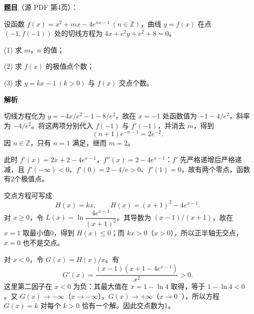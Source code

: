 \begin{answer}

\textbf{题目}（源 PDF 第4页）：

设函数 \(f(x)=x^2+mx-4e^{nx-1}\ (n\in\mathbb{Z})\)，曲线 \(y=f(x)\) 在点 \((-1,f(-1))\) 处的切线方程为 \(4x+e^2y+e^2+8=0\)。

(1) 求 \(m，n\) 的值；

(2) 求 \(f(x)\) 的极值点个数；

(3) 求 \(y=kx-1\ (k>0)\) 与 \(f(x)\) 交点个数。

\textbf{解析}


切线方程化为 \(y=-4x/e^2-1-8/e^2\)，故在 \(x=-1\) 处函数值为 \(-1-4/e^2\)，斜率为 \(-4/e^2\)。将这两项分别代入 \(f(-1)\) 与 \(f'(-1)\)，并消去 \(m\)，得到
\nopagebreak[4]
\[
(n+1)e^{-n-1}=2e^{-2}.
\]
因 \(n\in\mathbb Z\)，只有 \(n=1\) 满足，继而 \(m=2\)。


此时 \(f'(x)=2x+2-4e^{x-1}\)，\(f''(x)=2-4e^{x-1}\)：\(f'\) 先严格递增后严格递减，且 \(f'(-\infty)<0\)、\(f'(0)=2-4/e>0\)、\(f'(1)=0\)，故有两个零点，函数有2个极值点。


交点方程可写成
\nopagebreak[4]
\[
H(x)=kx,\qquad H(x)=(x+1)^2-4e^{x-1}.
\]
对 \(x\ge0\)，令 \(L(x)=\ln\dfrac{4e^{x-1}}{(x+1)^2}\)。其导数为 \((x-1)/(x+1)\)，故在 \(x=1\) 取最小值0，得到 \(H(x)\le0\)；而 \(kx>0\)（\(x>0\)），所以正半轴无交点，\(x=0\) 也不是交点。

对 \(x<0\)，令 \(G(x)=H(x)/x\)。有
\nopagebreak[4]
\[
G'(x)=\frac{(x-1)(x+1-4e^{x-1})}{x^2}>0.
\]
这里第二因子在 \(x<0\) 为负：其最大值在 \(x=1-\ln4\) 取得，等于 \(1-\ln4<0\)。又 \(G(x)\to-\infty\)（\(x\to-\infty\)），\(G(x)\to+\infty\)（\(x\to0^-\)），所以方程 \(G(x)=k\) 对每个 \(k>0\) 恰有一个解。因此交点数为1。




\end{answer}
